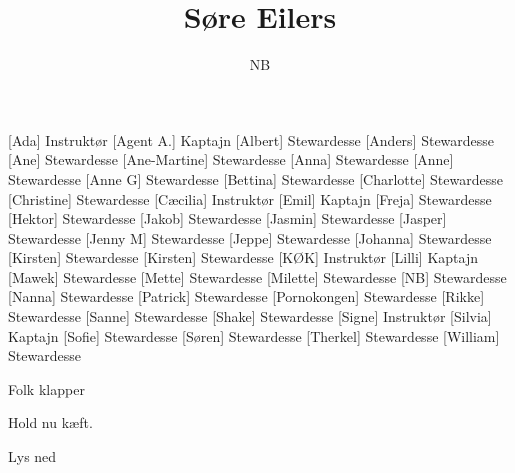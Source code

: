 \documentclass[a4paper,11pt]{article}
\title{Søre Eilers}
\author{NB}
\begin{document}
\maketitle

\begin{roles}
[Ada] Instruktør
[Agent A.] Kaptajn
[Albert] Stewardesse
[Anders] Stewardesse
[Ane] Stewardesse
[Ane-Martine] Stewardesse
[Anna] Stewardesse
[Anne] Stewardesse
[Anne G] Stewardesse
[Bettina] Stewardesse
[Charlotte] Stewardesse
[Christine] Stewardesse
[Cæcilia] Instruktør
[Emil] Kaptajn
[Freja] Stewardesse
[Hektor] Stewardesse
[Jakob] Stewardesse
[Jasmin] Stewardesse
[Jasper] Stewardesse
[Jenny M] Stewardesse
[Jeppe] Stewardesse
[Johanna] Stewardesse
[Kirsten] Stewardesse
[Kirsten] Stewardesse
[KØK] Instruktør
[Lilli] Kaptajn
[Mawek] Stewardesse
[Mette] Stewardesse
[Milette] Stewardesse
[NB] Stewardesse
[Nanna] Stewardesse
[Patrick] Stewardesse
[Pornokongen] Stewardesse
[Rikke] Stewardesse
[Sanne] Stewardesse
[Shake] Stewardesse
[Signe] Instruktør
[Silvia] Kaptajn
[Sofie] Stewardesse
[Søren] Stewardesse
[Therkel] Stewardesse
[William] Stewardesse
\end{roles}


\begin{sketch}
\scene Folk klapper

 Hold nu kæft.

\scene Lys ned
\end{sketch}
\end{document}
